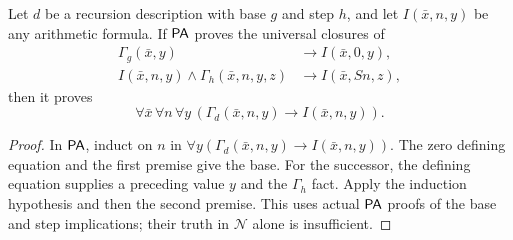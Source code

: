 \begin{corollary}
\label{cor:p05-pa-recursion-invariant}
Let \(d\) be a recursion description with base \(g\) and step \(h\),
and let \(I(\bar x,n,y)\) be any arithmetic formula.  If \(\mathsf{PA}\)
proves the universal closures of
\[
\begin{aligned}
 \Gamma_g(\bar x,y)&\to I(\bar x,0,y),\\
 I(\bar x,n,y)\land\Gamma_h(\bar x,n,y,z)&\to I(\bar x,Sn,z),
\end{aligned}
\]
then it proves
\[
 \forall\bar x\,\forall n\,\forall y\,
   (\Gamma_d(\bar x,n,y)\to I(\bar x,n,y)).
\]
\end{corollary}
\begin{proof}
In \(\mathsf{PA}\), induct on \(n\) in
\(\forall y(\Gamma_d(\bar x,n,y)\to I(\bar x,n,y))\).
The zero defining equation and the first premise give the base.  For the
successor, the defining equation supplies a preceding value \(y\) and
the \(\Gamma_h\) fact.  Apply the induction hypothesis and then the
second premise.  This uses actual \(\mathsf{PA}\) proofs of the base and step
implications; their truth in \(\mathcal N\) alone is insufficient.
\end{proof}

